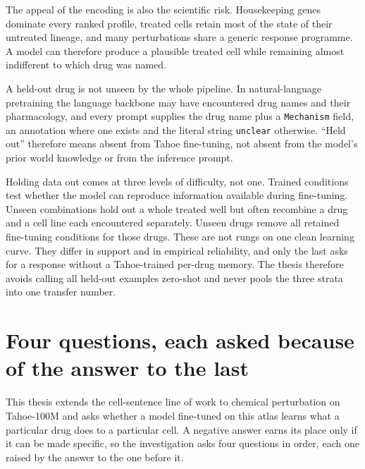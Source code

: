 The appeal of the encoding is also the scientific risk. Housekeeping genes
dominate every ranked profile, treated cells retain most of the state of their
untreated lineage, and many perturbations share a generic response programme. A
model can therefore produce a plausible treated cell while remaining almost
indifferent to which drug was named.

\begin{scopelimit}
A held-out drug is not unseen by the whole pipeline. In natural-language
pretraining the language backbone may have encountered drug names and their
pharmacology, and every prompt supplies the drug name plus a \texttt{Mechanism}
field, an annotation where one exists and the literal string \texttt{unclear}
otherwise.
``Held out'' therefore means absent from Tahoe fine-tuning, not absent from the
model's prior world knowledge or from the inference prompt.
\end{scopelimit}

Holding data out comes at three levels of difficulty, not one. Trained
conditions test whether the model can reproduce information available during
fine-tuning. Unseen combinations hold out a whole treated well but often
recombine a drug and a cell line each encountered separately. Unseen drugs
remove all retained fine-tuning conditions for those drugs. These are not rungs
on one clean learning curve. They differ in support and in empirical
reliability, and only the last asks for a response without a Tahoe-trained
per-drug memory. The thesis therefore avoids calling all held-out examples
zero-shot and never pools the three strata into one transfer number.

\section{Four questions, each asked because of the answer to the last}
\label{sec:intro-map}

This thesis extends the cell-sentence line of work to chemical perturbation on
Tahoe-100M and asks whether a model fine-tuned on this atlas learns what a
particular drug does to a particular cell. A negative answer earns its place
only if it can be made specific, so the investigation asks four questions in
order, each one raised by the answer to the one before it.

